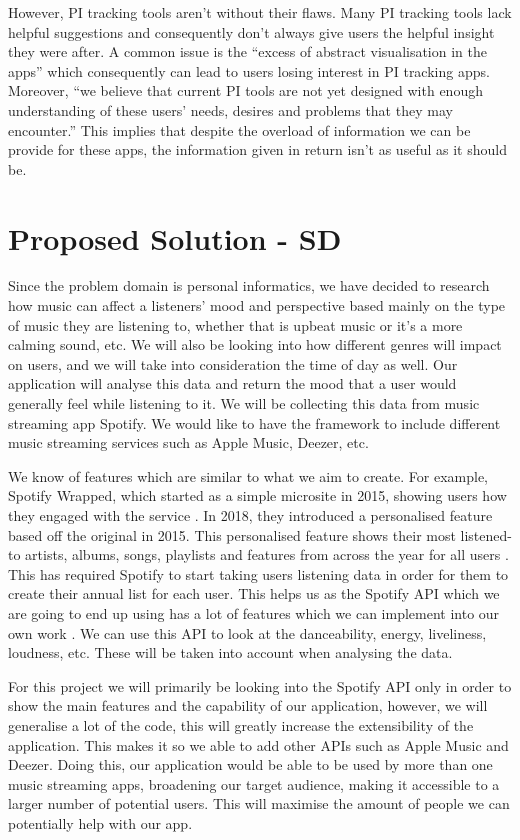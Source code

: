 \documentclass[10pt]{report}
\begin{document}
However, PI tracking tools aren’t without their flaws. Many PI tracking tools lack helpful suggestions and consequently don’t always give users the helpful insight they were after. A common issue is the “excess of abstract visualisation in the apps” \cite{Rapp2016} which consequently can lead to users losing interest in PI tracking apps. Moreover, “we believe that current PI tools are not yet designed with enough understanding of these users’ needs, desires and problems that they may encounter.” \cite{Rapp2016} This implies that despite the overload of information we can be provide for these apps, the information given in return isn’t as useful as it should be.


\section{Proposed Solution - SD}

Since the problem domain is personal informatics, we have decided to research how music can affect a listeners' mood and perspective based mainly on the type of music they are listening to, whether that is upbeat music or it’s a more calming sound, etc. We will also be looking into how different genres will impact on users, and we will take into consideration the time of day as well. Our application will analyse this data and return the mood that a user would generally feel while listening to it. We will be collecting this data from music streaming app Spotify. We would like to have the framework to include different music streaming services such as Apple Music, Deezer, etc.

We know of features which are similar to what we aim to create. For example, Spotify Wrapped, which started as a simple microsite in 2015, showing users how they engaged with the service \cite{Swant}. In 2018, they introduced a personalised feature based off the original in 2015. This personalised feature shows their most listened-to artists, albums, songs, playlists and features from across the year for all users \cite{Somerville}. This has required Spotify to start taking users listening data in order for them to create their annual list for each user. This helps us as the Spotify API which we are going to end up using has a lot of features which we can implement into our own work \cite{WebAPI}. We can use this API to look at the danceability, energy, liveliness, loudness, etc. These will be taken into account when analysing the data.

For this project we will primarily be looking into the Spotify API only in order to show the main features and the capability of our application, however, we will generalise a lot of the code, this will greatly increase the extensibility of the application. This makes it so we able to add other APIs such as Apple Music and Deezer. Doing this, our application would be able to be used by more than one music streaming apps, broadening our target audience, making it accessible to a larger number of potential users. This will maximise the amount of people we can potentially help with our app.
\end{document}

